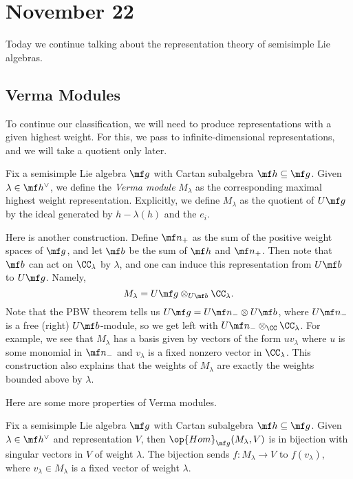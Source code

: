 \documentclass[../notes.tex]{subfiles}
\begin{document}
\section{November 22}
Today we continue talking about the representation theory of semisimple Lie algebras.

\subsection{Verma Modules}
To continue our classification, we will need to produce representations with a given highest weight. For this, we pass to infinite-dimensional representations, and we will take a quotient only later.
\begin{definition}
	Fix a semisimple Lie algebra $\mf g$ with Cartan subalgebra $\mf h\subseteq\mf g$. Given $\lambda\in\mf h^\lor$, we define the \textit{Verma module} $M_\lambda$ as the corresponding maximal highest weight representation. Explicitly, we define $M_\lambda$ as the quotient of $U\mf g$ by the ideal generated by $h-\lambda(h)$ and the $e_i$.
\end{definition}
\begin{remark}
	Here is another construction. Define $\mf n_+$ as the sum of the positive weight spaces of $\mf g$, and let $\mf b$ be the sum of $\mf h$ and $\mf n_+$. Then note that $\mf b$ can act on $\CC_\lambda$ by $\lambda$, and one can induce this representation from $U\mf b$ to $U\mf g$. Namely,
	\[M_\lambda=U\mf g\otimes_{U\mf b}\CC_\lambda.\]
	Note that the PBW theorem tells us $U\mf g=U\mf n_-\otimes U\mf b$, where $U\mf n_-$ is a free (right) $U\mf b$-module, so we get left with $U\mf n_-\otimes_\CC\CC_\lambda$. For example, we see that $M_\lambda$ has a basis given by vectors of the form $uv_\lambda$ where $u$ is some monomial in $\mf n_-$ and $v_\lambda$ is a fixed nonzero vector in $\CC_\lambda$. This construction also explains that the weights of $M_\lambda$ are exactly the weights bounded above by $\lambda$.
\end{remark}
Here are some more properties of Verma modules.
\begin{lemma}
	Fix a semisimple Lie algebra $\mf g$ with Cartan subalgebra $\mf h\subseteq\mf g$. Given $\lambda\in\mf h^\lor$ and representation $V$, then $\op{Hom}_{\mf g}(M_\lambda,V)$ is in bijection with singular vectors in $V$ of weight $\lambda$. The bijection sends $f\colon M_\lambda\to V$ to $f(v_\lambda)$, where $v_\lambda\in M_\lambda$ is a fixed vector of weight $\lambda$.
\end{lemma}
\end{document}
